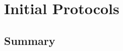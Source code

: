 \chapter{Initial Protocols}

    \graphicspath{{Chapter3/Figs/Vector/}{Chapter3/Figs/}}


\section{Summary}